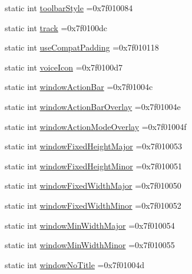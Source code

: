 \begin{DoxyCompactItemize}
\item 
static int \hyperlink{classandroid_1_1support_1_1graphics_1_1drawable_1_1R_1_1attr_ad1edc0d47dc9103614d9ecfdabe116b0}{toolbar\+Style} =0x7f010084
\item 
static int \hyperlink{classandroid_1_1support_1_1graphics_1_1drawable_1_1R_1_1attr_adc6ed90f8e501354319cd5f177d44d2c}{track} =0x7f0100dc
\item 
static int \hyperlink{classandroid_1_1support_1_1graphics_1_1drawable_1_1R_1_1attr_a3d87ec7f20ae1747ecf8e78e1806273a}{use\+Compat\+Padding} =0x7f010118
\item 
static int \hyperlink{classandroid_1_1support_1_1graphics_1_1drawable_1_1R_1_1attr_aae5efa527fb557e24819241828b45d9b}{voice\+Icon} =0x7f0100d7
\item 
static int \hyperlink{classandroid_1_1support_1_1graphics_1_1drawable_1_1R_1_1attr_a5e63de2c332366153263975d36d9bb0c}{window\+Action\+Bar} =0x7f01004c
\item 
static int \hyperlink{classandroid_1_1support_1_1graphics_1_1drawable_1_1R_1_1attr_ad7a0be15391a71f9e4bb290c66e13a4e}{window\+Action\+Bar\+Overlay} =0x7f01004e
\item 
static int \hyperlink{classandroid_1_1support_1_1graphics_1_1drawable_1_1R_1_1attr_a628f1008227259e1cdb40eee46de24db}{window\+Action\+Mode\+Overlay} =0x7f01004f
\item 
static int \hyperlink{classandroid_1_1support_1_1graphics_1_1drawable_1_1R_1_1attr_a4454ae1ef8a4e86e5b082c9ec101eb7f}{window\+Fixed\+Height\+Major} =0x7f010053
\item 
static int \hyperlink{classandroid_1_1support_1_1graphics_1_1drawable_1_1R_1_1attr_a25c1b23c8a0087d93b397eab05c67450}{window\+Fixed\+Height\+Minor} =0x7f010051
\item 
static int \hyperlink{classandroid_1_1support_1_1graphics_1_1drawable_1_1R_1_1attr_aa1b4ec15b6d5a74fafabce88f3a9e0ba}{window\+Fixed\+Width\+Major} =0x7f010050
\item 
static int \hyperlink{classandroid_1_1support_1_1graphics_1_1drawable_1_1R_1_1attr_acb889cc1fa6ccd797c484d34aca1aaf2}{window\+Fixed\+Width\+Minor} =0x7f010052
\item 
static int \hyperlink{classandroid_1_1support_1_1graphics_1_1drawable_1_1R_1_1attr_a2db07978ce02ea75d5b6aa991bda535a}{window\+Min\+Width\+Major} =0x7f010054
\item 
static int \hyperlink{classandroid_1_1support_1_1graphics_1_1drawable_1_1R_1_1attr_aa8df480df675f492a266a42fc0dbdfc6}{window\+Min\+Width\+Minor} =0x7f010055
\item 
static int \hyperlink{classandroid_1_1support_1_1graphics_1_1drawable_1_1R_1_1attr_a2aac649597814fa3c9f5f63575e0466f}{window\+No\+Title} =0x7f01004d
\end{DoxyCompactItemize}


